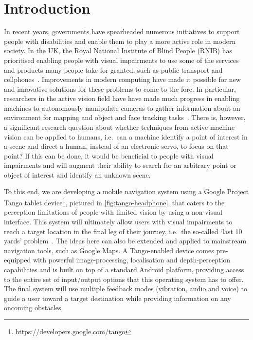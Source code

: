 \documentclass[sigconf, screen=true, anonymous=true]{acmart}
\begin{document}


\maketitle
\renewcommand{\shortauthors}{JC Lock et al.}

\section{Introduction}

In recent years, governments have spearheaded numerous initiatives to support people with disabilities and enable them to play a more active role in modern society.
In the UK, the Royal National Institute of Blind People (RNIB) has prioritised enabling people with visual impairments to use some of the services and products many people take for granted, such as public transport and cellphones~\cite{rnib-objectives}.
Improvements in modern computing have made it possible for new and innovative solutions for these problems to come to the fore.
In particular, researchers in the active vision field have have made much progress in enabling machines to autonomously manipulate cameras to gather information about an environment for mapping and object and face tracking tasks~\cite{bajcsy2018revisiting}.
There is, however, a significant research question about whether techniques from active machine vision can be applied to humans, i.e.\ can a machine identify a point of interest in a scene and direct a human, instead of an electronic servo, to focus on that point?
If this can be done, it would be beneficial to people with visual impairments and will augment their ability to search for an arbitrary point or object of interest and identify an unknown scene. 

To this end, we are developing a mobile navigation system using a Google Project Tango tablet device\footnote{https://developers.google.com/tango}, pictured in \cref{fig:tango-headphone}, that caters to the perception limitations of people with limited vision by using a non-visual interface.
This system will ultimately allow users with visual impairments to reach a target location in the final leg of their journey, i.e.\ the so-called `last 10 yards' problem~\cite{google2016blind,bellotto2013}. 
The ideas here can also be extended and applied to mainstream navigation tools, such as Google Maps.
A Tango-enabled device comes pre-equipped with powerful image-processing, localisation and depth-perception capabilities and is built on top of a standard Android platform, providing access to the entire set of input/output options that this operating system has to offer.
The final system will use multiple feedback modes (vibration, audio and voice) to guide a user toward a target destination while providing information on any oncoming obstacles.
\end{document}
